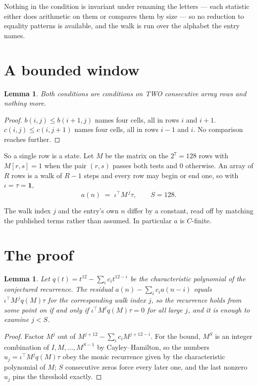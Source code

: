 \documentclass[11pt,a4paper]{article}
\theoremstyle{plain}
\newtheorem{lemma}[theorem]{Lemma}
\theoremstyle{definition}
\begin{document}
Nothing in the condition is invariant under renaming the letters --- each statistic either does
arithmetic on them or compares them by size --- so no reduction to equality patterns is
available, and the walk is run over the alphabet the entry names.

\section{A bounded window}

\begin{lemma}\label{lem:win}
Both conditions are conditions on TWO consecutive array rows and nothing more.
\end{lemma}

\begin{proof}
$b(i,j)\le b(i{+}1,j)$ names four cells, all in rows $i$ and $i+1$. $c(i,j)\le c(i,j{+}1)$
names four cells, all in rows $i-1$ and $i$. No comparison reaches further.
\end{proof}

So a single row is a state. Let $M$ be the matrix on the $2^{7}=128$ rows with
$M[r,s]=1$ when the pair $(r,s)$ passes both tests and $0$ otherwise. An array of $R$ rows is a
walk of $R-1$ steps and every row may begin or end one, so with $\iota=\tau=\mathbf{1}$,
\[
a(n)\;=\;\iota^{\!\top}M^{\,j}\tau ,\qquad S=128.
\]

The walk index $j$ and the entry's own $n$ differ by a constant, read off by matching the
published terms rather than assumed. In particular $a$ is $C$-finite.

\section{The proof}

\begin{lemma}\label{lem:crit}
Let $q(t)=t^{12}-\sum_i c_it^{12-i}$ be the characteristic polynomial of the
conjectured recurrence. The residual $a(n)-\sum_ic_ia(n-i)$ equals
$\iota^{\!\top}M^{\,j}q(M)\tau$ for the corresponding walk index $j$, so the recurrence
holds from some point on if and only if $\iota^{\!\top}M^{j}q(M)\tau=0$ for all large $j$,
and it is enough to examine $j<S$.
\end{lemma}

\begin{proof}
Factor $M^{j}$ out of $M^{j+12}-\sum_ic_iM^{j+12-i}$. For the bound, $M^{S}$
is an integer combination of $I,M,\dots,M^{S-1}$ by Cayley--Hamilton, so the numbers
$u_j=\iota^{\!\top}M^{j}q(M)\tau$ obey the monic recurrence given by the characteristic
polynomial of $M$; $S$ consecutive zeros force every later one, and the last nonzero $u_j$
pins the threshold exactly.
\end{proof}
\end{document}
